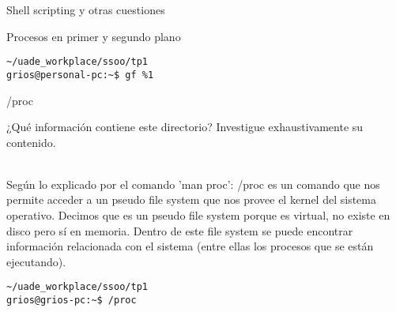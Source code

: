 \begin{section}{Shell scripting y otras cuestiones}
\begin{subsection}{Procesos en primer y segundo plano}
\begin{lstlisting}[style=Ubuntu]
~/uade_workplace/ssoo/tp1
grios@personal-pc:~$ gf %1
\end{lstlisting}
\end{subsection}


\begin{subsection}{/proc}

\begin{quoting}
¿Qué información contiene este directorio? Investigue exhaustivamente su contenido.
\end{quoting}\\
Según lo explicado por el comando 'man proc': /proc es un comando que nos permite acceder a un pseudo file system que nos provee el kernel del sistema operativo. Decimos que es un pseudo file system porque es virtual, no existe en disco pero sí en memoria. Dentro de este file system se puede encontrar información relacionada con el sistema (entre ellas los procesos que se están ejecutando).
\begin{lstlisting}[style=Ubuntu]
~/uade_workplace/ssoo/tp1
grios@grios-pc:~$ /proc   


\end{lstlisting}
\end{subsection}
\end{section}

